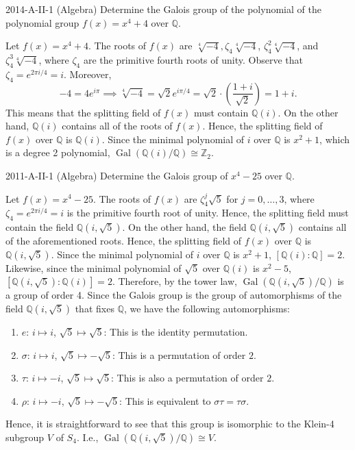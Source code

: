 \documentclass{article}
\begin{document}
\begin{prb}{2014-A-II-1 (Algebra)}
	Determine the Galois group of the polynomial of the polynomial group $f(x) = x^{4} + 4$ over $\mathbb{Q}$. 
\end{prb}
\begin{solutions}
	Let $f(x) = x^{4} + 4$. The roots of $f(x)$ are $\sqrt[4]{-4}, \zeta_{4}\sqrt[4]{-4}$, $\zeta_{4}^{2}\sqrt[4]{-4}$, and $\zeta_{4}^{3}\sqrt[4]{-4}$, where $\zeta_{4}$ are the primitive fourth roots of unity. Observe that $\zeta_{4} = e^{2\pi i/4} = i$. Moreover, 
		\begin{equation}
			-4 = 4e^{i\pi} \implies \sqrt[4]{-4} = \sqrt{2}e^{i\pi/4} = \sqrt{2} \cdot \left(\frac{1 + i}{\sqrt{2}}\right) = 1 + i. 
		\end{equation}
	This means that the splitting field of $f(x)$ must contain $\mathbb{Q}(i)$. On the other hand, $\mathbb{Q}(i)$ contains all of the roots of $f(x)$. Hence, the splitting field of $f(x)$ over $\mathbb{Q}$ is $\mathbb{Q}(i)$. Since the minimal polynomial of $i$ over $\mathbb{Q}$ is $x^{2} + 1$, which is a degree 2 polynomial, $\operatorname{Gal}(\mathbb{Q}(i)/\mathbb{Q}) \cong \mathbb{Z}_{2}$. 
\end{solutions}
\begin{prb}{2011-A-II-1 (Algebra)}
	Determine the Galois group of $x^{4} - 25$ over $\mathbb{Q}$. 
\end{prb}
\begin{solutions}
	Let $f(x) = x^{4} - 25$. The roots of $f(x)$ are $\zeta_{4}^{j}\sqrt{5}$ for $j = 0, \ldots, 3$, where $\zeta_{4} = e^{2\pi i/4} = i$ is the primitive fourth root of unity. Hence, the splitting field must contain the field $\mathbb{Q}(i,\sqrt{5})$. On the other hand, the field $\mathbb{Q}(i, \sqrt{5})$ contains all of the aforementioned roots. Hence, the splitting field of $f(x)$ over $\mathbb{Q}$ is $\mathbb{Q}(i,\sqrt{5})$. Since the minimal polynomial of $i$ over $\mathbb{Q}$ is $x^{2} + 1$, $[\mathbb{Q}(i): \mathbb{Q}] = 2$. Likewise, since the minimal polynomial of $\sqrt{5}$ over $\mathbb{Q}(i)$ is $x^{2} - 5$, $[\mathbb{Q}(i,\sqrt{5}): \mathbb{Q}(i)] = 2$. Therefore, by the tower law, $\operatorname{Gal}(\mathbb{Q}(i,\sqrt{5})/\mathbb{Q})$ is a group of order 4. Since the Galois group is the group of automorphisms of the field $\mathbb{Q}(i, \sqrt{5})$ that fixes $\mathbb{Q}$, we have the following automorphisms: 
		\begin{enumerate}[itemsep =-2pt,label = (\arabic{*})]
			\item $e$: $i \mapsto i$, $\sqrt{5} \mapsto \sqrt{5}$: This is the identity permutation. 
			\item $\sigma$: $i \mapsto i$, $\sqrt{5} \mapsto -\sqrt{5}$: This is a permutation of order $2$. 
			\item $\tau$: $i \mapsto -i$, $\sqrt{5} \mapsto \sqrt{5}$: This is also a permutation of order $2$. 
			\item $\rho$: $i \mapsto -i$, $\sqrt{5} \mapsto -\sqrt{5}$: This is equivalent to $\sigma\tau = \tau\sigma$. 
		\end{enumerate}
	Hence, it is straightforward to see that this group is isomorphic to the Klein-4 subgroup $V$ of $S_{4}$. I.e., $\operatorname{Gal}(\mathbb{Q}(i,\sqrt{5})/\mathbb{Q}) \cong V$. 
\end{solutions} 
\end{document}
